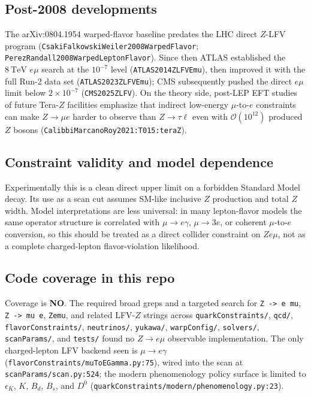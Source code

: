 \subsection*{Post-2008 developments}
The arXiv:0804.1954 warped-flavor baseline predates the LHC direct
\(Z\)-LFV program (\texttt{CsakiFalkowskiWeiler2008WarpedFlavor};
\texttt{PerezRandall2008WarpedLeptonFlavor}).  Since then ATLAS established
the \(8~\mathrm{TeV}\) \(e\mu\) search at the \(10^{-7}\) level
(\texttt{ATLAS2014ZLFVEmu}), then improved it with the full Run-2 data set
(\texttt{ATLAS2023ZLFVEmu}); CMS subsequently pushed the direct \(e\mu\)
limit below \(2\times10^{-7}\) (\texttt{CMS2025ZLFV}).  On the theory side,
post-LEP EFT studies of future Tera-\(Z\) facilities emphasize that indirect
low-energy \(\mu\)-to-\(e\) constraints can make \(Z\to \mu e\) harder to
observe than \(Z\to\tau\ell\) even with \(\mathcal{O}(10^{12})\) produced
\(Z\) bosons
(\texttt{CalibbiMarcanoRoy2021:T015:teraZ}).

\subsection*{Constraint validity and model dependence}
Experimentally this is a clean direct upper limit on a forbidden Standard
Model decay.  Its use as a scan cut assumes SM-like inclusive \(Z\) production
and total \(Z\) width.  Model interpretations are less universal: in many
lepton-flavor models the same operator structure is correlated with
\(\mu\to e\gamma\), \(\mu\to3e\), or coherent \(\mu\)-to-\(e\) conversion,
so this should be treated as a direct collider constraint on \(Z e\mu\), not
as a complete charged-lepton flavor-violation likelihood.

\subsection*{Code coverage in this repo}
Coverage is \textbf{NO}.  The required broad greps and a targeted search for
\texttt{Z -> e mu}, \texttt{Z -> mu e}, \texttt{Zemu}, and related LFV-\(Z\)
strings across \texttt{quarkConstraints/}, \texttt{qcd/},
\texttt{flavorConstraints/}, \texttt{neutrinos/}, \texttt{yukawa/},
\texttt{warpConfig/}, \texttt{solvers/}, \texttt{scanParams/}, and
\texttt{tests/} found no \(Z\to e\mu\) observable implementation.  The only
charged-lepton LFV backend seen is \(\mu\to e\gamma\)
(\texttt{flavorConstraints/muToEGamma.py:75}), wired into the scan at
\texttt{scanParams/scan.py:524}; the modern phenomenology policy surface is
limited to \(\epsilon_K\), \(K\), \(B_d\), \(B_s\), and \(D^0\)
(\texttt{quarkConstraints/modern/phenomenology.py:23}).

